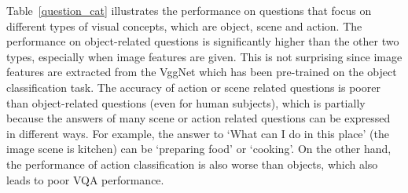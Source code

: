 \documentclass[10pt,journal]{IEEEtran}
\begin{document}
\begin{table*}[h!]
\centering
{}
\caption{Facts prediction accuracy for our proposed methods. Best results are shown in bold font. $\ddagger$~indicates that ground truth Question-Query mappings are used, which (in \colorbox[rgb]{0.8,0.8,0.8}{gray}) will not participate in rankings.}
\label{facts}
\end{table*}







Table~\ref{question_cat} illustrates the performance on questions that focus on different types of visual concepts, which are object, scene and action.
The performance on object-related questions is significantly higher than the other two types, especially when image features are given.
This is not surprising since image features are extracted from the VggNet which has been pre-trained on the object classification task.
{
The accuracy of action or scene related questions is poorer than object-related questions (even for human subjects),
which is partially because the answers of many scene or action related questions can be expressed in different ways.
For example, the answer to `What can I do in this place' (the image scene is kitchen) can be `preparing food' or `cooking'.
On the other hand, the performance of action classification is also worse than objects, which also leads to poor VQA performance.
}
\end{document}
